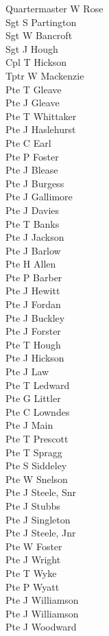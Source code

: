 \begin{multicols}{3}
  \small
  \noindent
  Quartermaster W Rose \\
  Sgt S Partington \\
  Sgt W Bancroft \\
  Sgt J Hough \\
  Cpl T Hickson \\
  Tptr W Mackenzie \\
  Pte T Gleave \\
  Pte J Gleave \\
  Pte T Whittaker \\
  Pte J Haslehurst \\
  Pte C Earl \\
  Pte P Foster \\
  Pte J Blease \\
  Pte J Burgess \\
  Pte J Gallimore \\
  Pte J Davies \\
  Pte T Banks \\
  Pte J Jackson \\
  Pte J Barlow \\
  Pte H Allen \\
  Pte P Barber \\
  Pte J Hewitt \\
  Pte J Fordan \\
  Pte J Buckley \\
  Pte J Forster \\
  Pte T Hough \\
  Pte J Hickson \\
  Pte J Law \\
  Pte T Ledward \\
  Pte G Littler \\
  Pte C Lowndes \\
  Pte J Main \\
  Pte T Prescott \\
  Pte T Spragg \\
  Pte S Siddeley \\
  Pte W Snelson \\
  Pte J Steele, Snr \\
  Pte J Stubbs \\
  Pte J Singleton \\
  Pte J Steele, Jnr \\
  Pte W Foster \\
  Pte J Wright \\
  Pte T Wyke \\
  Pte P Wyatt \\
  Pte J Williamson \\
  Pte J Williamson \\
  Pte J Woodward \\
\end{multicols}

